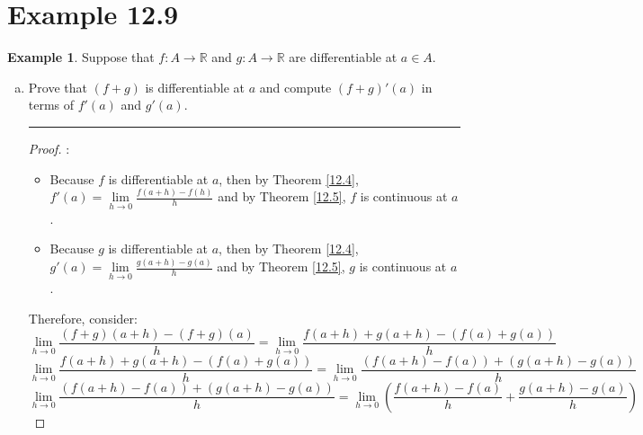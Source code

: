 \documentclass[openany, amssymb, psamsfonts]{amsart}
\newcommand{\bbR}{\mathbb{R}}
\theoremstyle{definition}
\newtheorem{exmp}{Example}[section]
\numberwithin{equation}{section}
\begin{document}
\section*{Example 12.9}
\begin{exmp} 
\label{12.9}
	Suppose that $f\colon A\to\bbR$ and $g\colon A\to\bbR$ are differentiable at $a\in A$. 
	\begin{enumerate}[(a)]
		\item Prove that $(f+g)$ is differentiable at $a$ and compute $(f + g)'(a)$ in terms of $f'(a)$ and $g'(a)$. 
\vspace{4pt}     \hrule   \vspace{4pt}  \begin{proof}:\\
\begin{itemize}
    \item Because $f$ is differentiable at $a$, then by Theorem \ref{12.4}, $f'(a) = \lim\limits_{h\to 0} \frac{f(a+h) - f(h)}{h}$ and by Theorem \ref{12.5}, $f$ is continuous at $a$. 
    \item Because $g$ is differentiable at $a$, then by Theorem \ref{12.4}, $g'(a) = \lim\limits_{h\to 0} \frac{g(a+h) - g(a)}{h}$ and by Theorem \ref{12.5}, $g$ is continuous at $a$.
\end{itemize} 
Therefore, consider:
\[\lim\limits_{h\to 0} \frac{(f+g)(a+h) - (f+g)(a)}{h} = \lim\limits_{h\to 0} \frac{f(a+h) + g(a+h) - (f(a) + g(a))}{h} \]
\[\lim\limits_{h\to 0} \frac{f(a+h) + g(a+h) - (f(a) + g(a))}{h} = \lim\limits_{h\to 0} \frac{(f(a+h) - f(a)) +(g(a+h) - g(a))}{h}\]
\[\lim\limits_{h\to 0} \frac{(f(a+h) - f(a)) +(g(a+h) - g(a))}{h} = \lim\limits_{h\to 0 } (\frac{f(a+h) - f(a)}{h} + \frac{g(a+h) - g(a)}{h})\]


\end{proof}
\end{enumerate}
\end{exmp}
\end{document}
